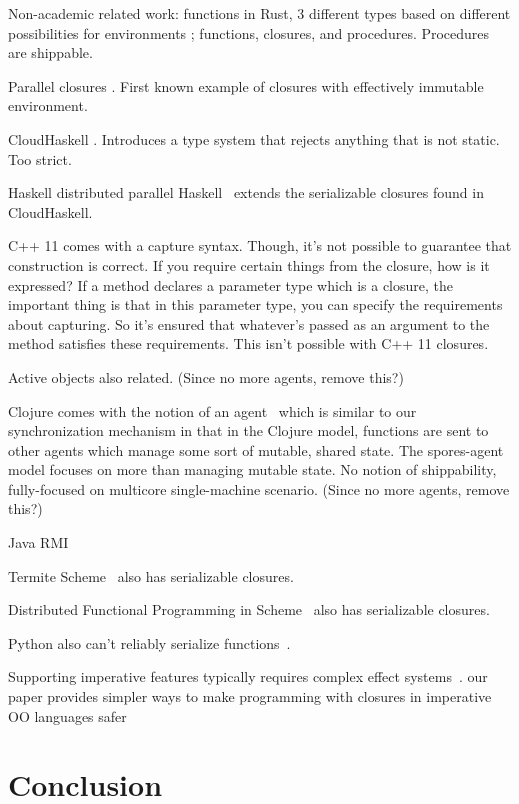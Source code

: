 \documentclass{llncs}
\begin{document}
Non-academic related work: functions in Rust, 3 different types based on
different possibilities for environments \cite{RustFunctions}; functions,
closures, and procedures. Procedures are shippable.

Parallel closures \cite{ParallelClosures}. First known example of closures
with effectively immutable environment.

CloudHaskell \cite{CloudHaskell}. Introduces a type system that rejects anything
that is not static. Too strict.

Haskell distributed parallel Haskell~\cite{HDPH} extends the serializable closures found in CloudHaskell.

C++ 11 comes with a capture syntax. Though, it's not possible to guarantee that construction is correct. If you require certain things from the closure, how is it expressed? If a method declares a parameter type which is a closure, the important thing is that in this parameter type, you can specify the requirements about capturing. So it's ensured that whatever's passed as an argument to the method satisfies these requirements. This isn't possible with C++ 11 closures. \cite{CplusplusLambas}

Active objects also related. \cite{ActiveObjects} (Since no more agents, remove this?)

Clojure comes with the notion of an agent~\cite{Clojure} which is similar to our synchronization mechanism in that in the Clojure model, functions are sent to other agents which manage some sort of mutable, shared state. The spores-agent model focuses on more than managing mutable state. No notion of shippability, fully-focused on multicore single-machine scenario. (Since no more agents, remove this?)

Java RMI~\cite{JavaRMI}

Termite Scheme~\cite{Termite} also has serializable closures.

Distributed Functional Programming in Scheme~\cite{DFPS} also has serializable closures.

Python also can't reliably serialize functions~\cite{PythonPickle}.

Supporting imperative features typically requires complex effect systems~\cite{DPJ}. our paper provides simpler ways to make programming with closures in imperative OO languages safer

\section{Conclusion}



\end{document}
